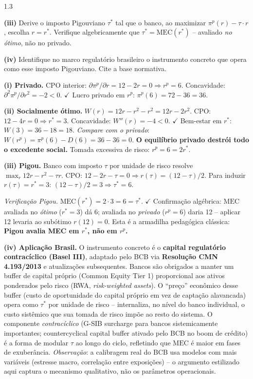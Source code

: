 \documentclass[11pt,addpoints]{exam}
\newcommand{\MEC}{\text{MEC}}
\begin{document}
\begin{spacing}{1.3}
\begin{questions}
\begin{parts}
\textbf{(iii)} Derive o imposto Pigouviano $\tau^*$ tal que o banco, ao maximizar $\pi^p(r) - \tau\cdot r$, escolha $r = r^*$. Verifique algebricamente que $\tau^* = \MEC(r^*)$ -- avaliado \emph{no ótimo}, não no privado.

\textbf{(iv)} Identifique no marco regulatório brasileiro o instrumento concreto que opera como esse imposto Pigouviano. Cite a base normativa.

\begin{solution}
\textbf{(i) Privado.} CPO interior: $\partial \pi^p/\partial r = 12 - 2 r = 0 \Rightarrow \boxed{r^p = 6.}$ Concavidade: $\partial^2 \pi^p/\partial r^2 = -2 < 0$. $\checkmark$ Lucro privado em $r^p$: $\pi^p(6) = 72 - 36 = 36$.

\textbf{(ii) Socialmente ótimo.} $W(r) = 12 r - r^2 - r^2 = 12 r - 2 r^2$. CPO: $12 - 4 r = 0 \Rightarrow \boxed{r^* = 3.}$ Concavidade: $W''(r) = -4 < 0$. $\checkmark$ Bem-estar em $r^*$: $W(3) = 36 - 18 = 18$. \emph{Compare com o privado}: $W(r^p) = \pi^p(6) - D(6) = 36 - 36 = 0$. \textbf{O equilíbrio privado destrói todo o excedente social.} Tomada excessiva de risco: $r^p = 6 = 2 r^*$.

\textbf{(iii) Pigou.} Banco com imposto $\tau$ por unidade de risco resolve $\max_r 12 r - r^2 - \tau r$. CPO: $12 - 2 r - \tau = 0 \Rightarrow r(\tau) = (12 - \tau)/2$. Para induzir $r(\tau) = r^* = 3$: $(12 - \tau)/2 = 3 \Rightarrow \boxed{\tau^* = 6.}$

\emph{Verificação Pigou.} $\MEC(r^*) = 2\cdot 3 = 6 = \tau^*$. $\checkmark$ Confirmação algébrica: $\MEC$ avaliada no \emph{ótimo} ($r^* = 3$) dá 6; avaliada no \emph{privado} ($r^p = 6$) daria 12 -- aplicar 12 levaria ao subótimo $r(12) = 0$. Esta é a armadilha pedagógica clássica: \textbf{Pigou avalia MEC em $r^*$, não em $r^p$.}

\textbf{(iv) Aplicação Brasil.} O instrumento concreto é o \textbf{capital regulatório contracíclico (Basel III)}, adaptado pelo BCB via \textbf{Resolução CMN 4.193/2013} e atualizações subsequentes. Bancos são obrigados a manter um buffer de capital próprio (Common Equity Tier 1) proporcional aos ativos ponderados pelo risco (RWA, \emph{risk-weighted assets}). O ``preço'' econômico desse buffer (custo de oportunidade do capital próprio em vez de captação alavancada) opera como $\tau^*$ por unidade de risco -- internaliza, no nível do banco individual, o custo sistêmico que sua tomada de risco impõe ao resto do sistema. O componente \emph{contracíclico} (G-SIB surcharge para bancos sistemicamente importantes; countercyclical capital buffer ativado pelo BCB no boom de crédito) é a forma de modular $\tau$ ao longo do ciclo, refletindo que $\MEC$ é maior em fases de exuberância. \textit{Observação}: a calibragem real do BCB usa modelos com mais variáveis (estresse macro, correlação entre exposições) -- o argumento estilizado aqui captura o mecanismo qualitativo, não os parâmetros operacionais.
\end{solution}


\end{parts}
\end{questions}
\end{spacing}
\end{document}
